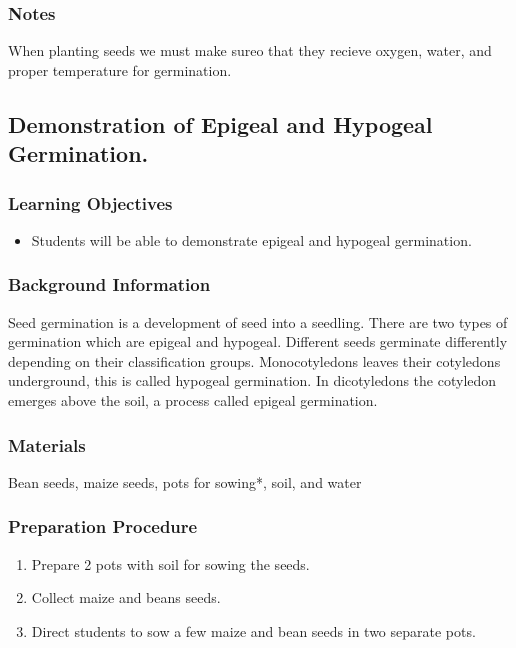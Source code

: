 \subsubsection*{Notes}
When planting seeds we must make sureo that they recieve oxygen, water, and proper temperature for germination.


\subsection{Demonstration of Epigeal and Hypogeal Germination.}

\subsubsection*{Learning Objectives}
\begin{itemize}
\item{Students will be able to demonstrate epigeal and hypogeal germination.}
\end{itemize}

\subsubsection*{Background Information}
Seed germination is a development of seed into a seedling. There are two types of germination which are epigeal and hypogeal. Different seeds germinate differently depending on their classification groups.  Monocotyledons leaves their cotyledons underground, this is called hypogeal germination. In dicotyledons the cotyledon emerges above the soil, a process called epigeal germination.

\subsubsection*{Materials}
Bean seeds, maize seeds, pots for sowing*, soil, and water

\subsubsection*{Preparation Procedure}
\begin{enumerate}
\item{Prepare 2 pots with soil for sowing the seeds.}
\item{Collect maize and beans seeds.}
\item{Direct students to sow a few maize and bean seeds in two separate pots.}
\end{enumerate}

